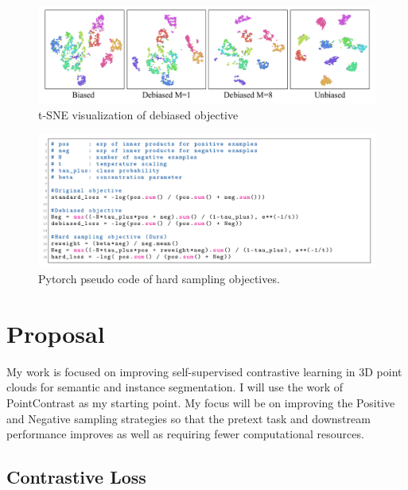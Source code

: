 \documentclass[12pt]{article}
\begin{document}
\begin{figure}[h!]
    \begin{center}
        \includegraphics[scale=0.45]{images/debiased.png}
        \caption{t-SNE visualization of debiased objective \cite{chuang_debiased_2020}}
    \end{center}
\end{figure}
\newpage
\begin{figure}[h!]
    \begin{center}
        \includegraphics[scale=0.4]{images/hard-samplign.png}
        \caption{Pytorch pseudo code of hard sampling objectives. \cite{robinson_contrastive_2021}}
    \end{center}
\end{figure}

\newpage
\pagebreak
\newpage

\section{Proposal}

My work is focused on improving self-supervised contrastive learning in 3D point clouds for semantic and instance segmentation. I will use the work of PointContrast as my starting point. My focus will be on improving the Positive and Negative sampling strategies so that the pretext task and downstream performance improves as well as requiring fewer computational resources.

\subsection{Contrastive Loss}
\end{document}

